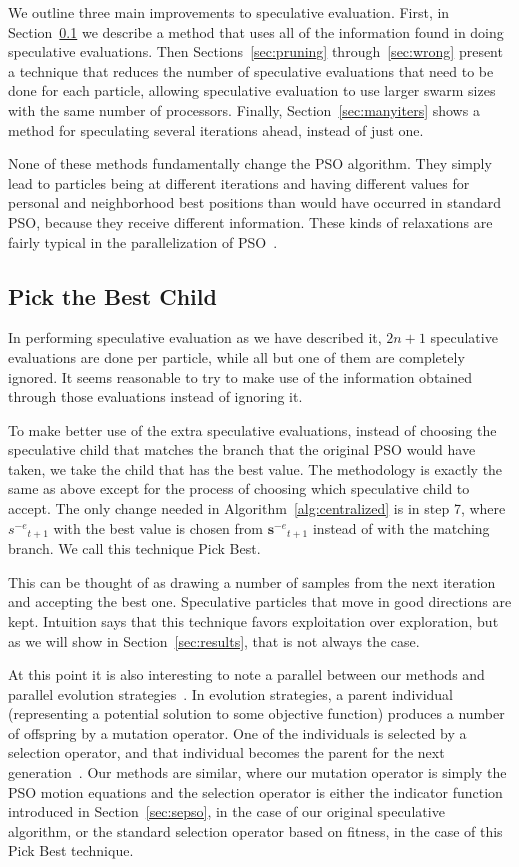 \documentclass[smallcondensed]{svjour3}
\renewcommand{\sec}[1]{Section~\ref{sec:#1}}
\newcommand{\alg}[1]{Algorithm~\ref{alg:#1}}
\providecommand{\noeval}[1]{\ensuremath{#1^{-e}}}
\providecommand{\s}{\ensuremath{s}}
\providecommand{\sset}{\ensuremath{\mathbf{s}}}
\begin{document}
We outline three main improvements to speculative evaluation.  First, in
\sec{pickbest} we describe a method that uses all of the information found in
doing speculative evaluations.  Then Sections~\ref{sec:pruning}
through~\ref{sec:wrong} present a technique that reduces the number of
speculative evaluations that need to be done for each particle, allowing
speculative evaluation to use larger swarm sizes with the same number of
processors.  Finally, \sec{manyiters} shows a method for speculating several
iterations ahead, instead of just one.

None of these methods fundamentally change the PSO algorithm.  They simply lead
to particles being at different iterations and having different values for
personal and neighborhood best positions than would have occurred in standard
PSO, because they receive different information.  These kinds of relaxations
are fairly typical in the parallelization of
PSO~\citep{koh-2006-parallel-asynchronous-pso}.

\subsection{Pick the Best Child}
\label{sec:pickbest}

In performing speculative evaluation as we have described it, $2n+1$
speculative evaluations are done per particle, while all but one of them are
completely ignored.  It seems reasonable to try to make use of the information
obtained through those evaluations instead of ignoring it.

To make better use of the extra speculative evaluations, instead of choosing
the speculative child that matches the branch that the original PSO would have
taken, we take the child that has the best value.  The methodology is exactly
the same as above except for the process of choosing which speculative child to
accept.  The only change needed in \alg{centralized} is in step 7, where
$\noeval{\s}_{t+1}$ with the best value is chosen from $\noeval{\sset}_{t+1}$
instead of with the matching branch.  We call this technique Pick Best.

This can be thought of as drawing a number of samples from the next iteration
and accepting the best one.  Speculative particles that move in good directions
are kept.  Intuition says that this technique favors exploitation over
exploration, but as we will show in \sec{results}, that is not always the case.

At this point it is also interesting to note a parallel between our methods and
parallel evolution
strategies~\citep{rudolph-1991-distributed-evolution-strategies}.  In evolution
strategies, a parent individual (representing a potential solution to some
objective function) produces a number of offspring by a mutation operator.  One
of the individuals is selected by a selection operator, and that individual
becomes the parent for the next
generation~\citep{beyer-2002-evolution-strategies}.  Our methods are similar,
where our mutation operator is simply the PSO motion equations and the
selection operator is either the indicator function introduced in \sec{sepso},
in the case of our original speculative algorithm, or the standard selection
operator based on fitness, in the case of this Pick Best technique.
\end{document}

